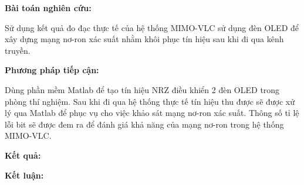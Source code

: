\vspace{\baselineskip}
\textbf{Bài toán nghiên cứu:}

Sử dụng kết quả đo đạc thực tế của hệ thống MIMO-VLC sử dụng đèn OLED để xây dựng mạng nơ-ron xác suất nhằm khôi phục tín hiệu sau khi đi qua kênh truyền.

\vspace{\baselineskip}

\textbf{Phương pháp tiếp cận:}

Dùng phần mềm Matlab để tạo tín hiệu NRZ điều khiển 2 đèn OLED trong phòng thí nghiệm. Sau khi đi qua hệ thống thực tế tín hiệu thu được sẽ được xử lý qua Matlab để phục vụ cho việc khảo sát mạng nơ-ron xác suất. Thông số tỉ lệ lỗi bit sẽ được đem ra để đánh giá khả năng của mạng nơ-ron trong hệ thống MIMO-VLC. 

\vspace{\baselineskip}


\textbf{Kết quả:}

\vspace{\baselineskip}
\textbf{Kết luận:}


